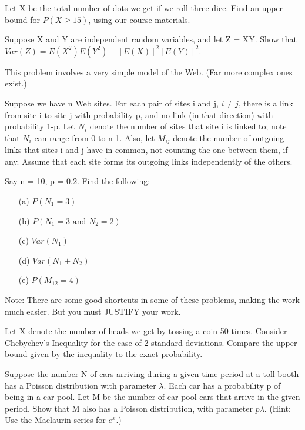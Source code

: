 \oneproblem
Let X be the total number of dots we get if we roll three
dice.  Find an upper bound for $P(X \geq 15)$, using our course
materials.

\oneproblem
Suppose X and Y are independent random variables, and let Z = XY. Show
that $Var(Z) = E(X^2)   E(Y^2) - [E(X)]^2   [E(Y)]^2$. 

\oneproblem
This problem involves a very simple model of the Web. (Far more complex
ones exist.)

Suppose we have n Web sites. For each pair of sites i and j, $i \neq j$,
there is a link from site i to site j with probability p, and no link
(in that direction) with probability 1-p. Let $N_i$ denote the number of
sites that site i is linked to; note that $N_i$ can range from 0 to n-1.
Also, let $M_{ij}$ denote the number of outgoing links that sites i and
j have in common, not counting the one between them, if any. Assume that
each site forms its outgoing links independently of the others.

Say n = 10, p = 0.2. Find the following:

\begin{itemize}

\item [(a)] $P(N_1 = 3)$

\item [(b)] $P(N_1 = 3 \textrm{ and } N_2 = 2)$

\item [(c)] $Var(N_1)$

\item [(d)] $Var(N_1 + N_2)$

\item [(e)] $P(M_{12} = 4)$

\end{itemize}

Note: There are some good shortcuts in some of these problems, making
the work much easier. But you must JUSTIFY your work.

\oneproblem
Let X denote the number of heads we get by tossing a coin 50 times.
Consider Chebychev's Inequality for the case of 2 standard deviations.
Compare the upper bound given by the inequality to the exact probability.

\oneproblem
Suppose the number N of cars arriving during a given time period at a
toll booth has a Poisson distribution with parameter $\lambda$. Each 
car has a probability p of being in a car pool. Let M be the number of
car-pool cars that arrive in the given period. Show that M also has a Poisson   
distribution, with parameter $p \lambda$. (Hint: Use the Maclaurin series for   
$e^x$.) 

